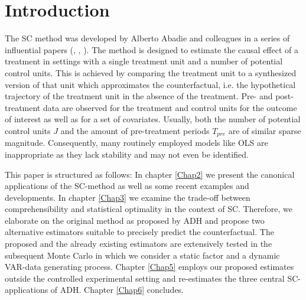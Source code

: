 \section{Introduction}
The \ac{SC} method was developed by Alberto Abadie and colleagues in a series of influential papers (\cite{abadie:2003}, \cite{abadie:2010}, \cite{abadie:2015}). The method is designed to estimate the causal effect of a treatment in settings with a single treatment unit and a number of potential control units. This is achieved by comparing the treatment unit to a synthesized version of that unit which approximates the counterfactual, i.e. the hypothetical trajectory of the treatment unit in the absence of the treatment. Pre- and post-treatment data are observed for the treatment and control units for the outcome of interest as well as for a set of covariates. Usually, both the number of potential control units $J$ and the amount of pre-treatment periods $T_{pre}$ are of similar sparse magnitude. Consequently, many routinely employed models like \ac{OLS} are inappropriate as they lack stability and may not even be identified. 

This paper is structured as follows: In chapter \ref{Chap2} we present the canonical applications of the \ac{SC}-method as well as some recent examples and developments. In chapter \ref{Chap3} we examine the trade-off between comprehensibility and statistical optimality in the context of \ac{SC}. Therefore, we elaborate on the original method as proposed by \ac{ADH} and propose two alternative estimators suitable to precisely predict the counterfactual. The proposed and the already existing estimators are extensively tested in the subsequent Monte Carlo in which we consider a static factor and a dynamic \ac{VAR}-data generating process. Chapter \ref{Chap5} employs our proposed estimates outside the controlled experimental setting and re-estimates the three central \ac{SC}-applications of \ac{ADH}. Chapter \ref{Chap6} concludes.